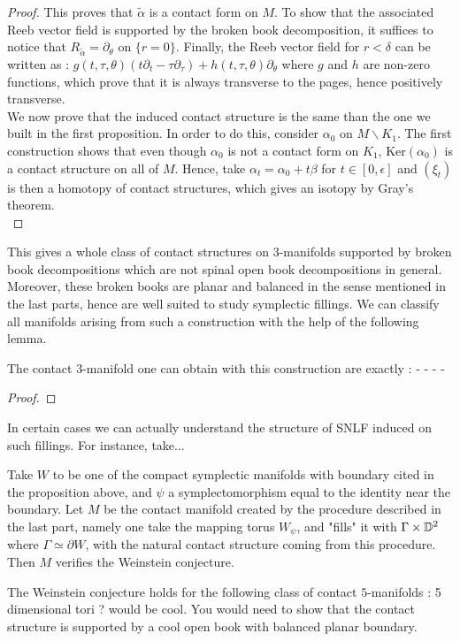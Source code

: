 \documentclass[../main.tex]{subfiles}
\begin{document}
\begin{proof}
This proves that $\tilde{\alpha}$ is a contact form on $M$. To show that the associated Reeb vector field is supported by the broken book decomposition, it suffices to notice that $R_{\tilde{\alpha} } = \partial_\theta$ on $\{r = 0\}$. Finally, the Reeb vector field for $r<\delta$ can be written as : 
$g(t,\tau,\theta) (t\partial_t - \tau\partial_\tau) + h(t,\tau,\theta)\partial_\theta$ where $g$ and $h$ are non-zero functions, which prove that it is always transverse to the pages, hence positively transverse.\\

We now prove that the induced contact structure is the same than the one we built in the first proposition. In order to do this, consider $\alpha_0$ on $M\backslash K_1$. The first construction shows that even though $\alpha_0$ is not a contact form on $K_1$, $\text{Ker}(\alpha_0)$ is a contact structure on all of $M$. Hence, take $\alpha_t = \alpha_0 + t\beta$ for $t\in[0,\epsilon]$ and $(\xi_t)$ is then a homotopy of contact structures, which gives an isotopy by Gray's theorem.\\



\end{proof}



This gives a whole class of contact structures on 3-manifolds supported by broken book decompositions which are not spinal open book decompositions in general. Moreover, these broken books are planar and balanced in the sense mentioned in the last parts, hence are well suited to study symplectic fillings. We can classify all manifolds arising from such a construction with the help of the following lemma.

\begin{proposition}
The contact 3-manifold one can obtain with this construction are exactly :
-
-
-
-
\end{proposition}

\begin{proof}
    
\end{proof}


\begin{remark}
In certain cases we can actually understand the structure of SNLF induced on such fillings. For instance, take...
\end{remark}


\begin{corollary}
Take $W$ to be one of the compact symplectic manifolds with boundary cited in the proposition above, and $\psi$ a symplectomorphism equal to the identity near the boundary. Let $M$ be the contact manifold created by the procedure described in the last part, namely one take the mapping torus $W_\psi$, and "fills" it with $\Gamma\times \mathbb{D}^2$ where $\Gamma \simeq \partial W$, with the natural contact structure coming from this procedure. \\

Then $M$ verifies the Weinstein conjecture.
\end{corollary}


\begin{corollary}
The Weinstein conjecture holds for the following class of contact $5$-manifolds : 
5 dimensional tori ? would be cool. You would need to show that the contact structure is supported by a cool open book with balanced planar boundary.
\end{corollary}
\end{document}
